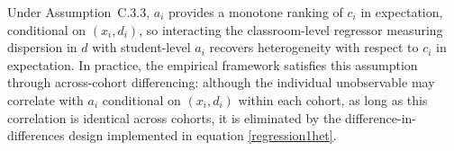 Under Assumption~C.3.3, $a_i$ provides a monotone ranking of $c_i$ in expectation, conditional on $(x_i,d_i)$, so interacting the classroom-level regressor measuring dispersion in $d$ with student-level $a_i$ recovers heterogeneity with respect to $c_i$ in expectation. In practice, the empirical framework satisfies this assumption through across-cohort differencing: although the individual unobservable may correlate with $a_i$ conditional on $(x_i,d_i)$ within each cohort, as long as this correlation is identical across cohorts, it is eliminated by the difference-in-differences design implemented in equation \eqref{regression1het}.




